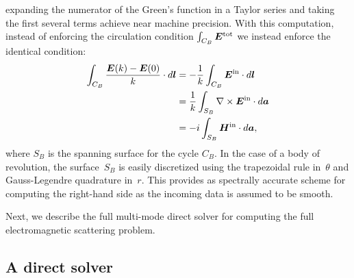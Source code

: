 \documentclass[11pt]{article}
\newcommand{\vct}{\vectorsym}
\newcommand{\bE}{\vectorsym{E}}
\newcommand\bl{\vct{ l}}
\newcommand\ba{\vct{a}}
\newcommand\bEtot{\vct{E}^\textnormal{tot}}
\newcommand\bEin{\vct{E}^\textnormal{in}}
\newcommand\bHin{\vct{H}^\textnormal{in}}
\numberwithin{equation}{section}
\begin{document}
expanding the numerator of the Green's function in a
Taylor series and taking the first several terms achieve
near machine precision. With this computation, instead of enforcing
the circulation condition $\int_{C_B} \bEtot$ we instead enforce the
identical condition:
\begin{equation}
  \begin{aligned}
    \int_{C_B} \frac{\bE(k) - \bE(0) }{k} \cdot d\bl &=
    -\frac{1}{k} \int_{C_B} \bEin \cdot d\bl \\
    &= \frac{1}{k} \int_{S_B}\nabla \times \bEin \cdot d\ba \\
    &= -i \int_{S_B} \bHin \cdot d\ba,
  \end{aligned}
\end{equation}
where $S_B$ is the spanning surface for the cycle $C_B$. In the case
of a body of revolution, the surface~$S_B$ is easily discretized using
the trapezoidal rule in~$\theta$ and Gauss-Legendre quadrature
in~$r$. This provides as spectrally accurate scheme for computing the
right-hand side as the incoming data is assumed to be smooth.

Next, we describe the full multi-mode direct solver for computing the
full electromagnetic scattering problem.




\subsection{A direct solver}
\label{sec_direct}
\end{document}
